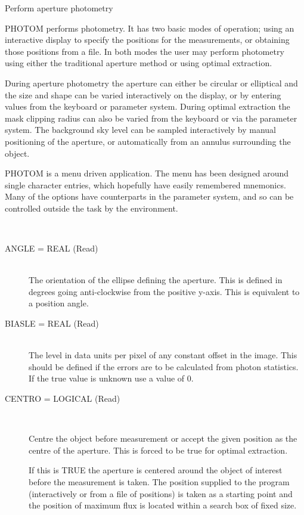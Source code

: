 \documentclass[twoside,11pt]{article}
\renewcommand{\_}{\texttt{\symbol{95}}}
\newcommand{\sstdescription}[1]{\item[Description:] #1}
\newcommand{\sstparameters}[1]{
   \item[Parameters:] \mbox{} \\
   \vspace{-3.5ex}
   \begin{description}
      #1
   \end{description}
}
\newcommand{\sstsubsection}[1]{ \item[{#1}] \mbox{} \\}
\newcommand{\sstdescription}[1]{\item[Description:]
      \begin{description}
         #1
      \end{description}
      \\
   }
\newcommand{\sstparameters}[1]{
      \item[Parameters:] \\
      \begin{description}
         #1
      \end{description}
      \\
   }
\newcommand{\sstsubsection}[1]{\item[{#1}]}
\begin{document}
{
   Perform aperture photometry
}{
   \sstdescription{
      PHOTOM performs photometry. It has two basic modes of operation;
      using an interactive display to specify the positions for the
      measurements, or obtaining those positions from a file. In both
      modes the user may perform photometry using either the traditional
      aperture method or using optimal extraction.

      During aperture photometry the aperture can either be circular
      or elliptical and the size and shape can be varied interactively
      on the display, or by entering values from the keyboard or parameter
      system. During optimal extraction the mask clipping radius can also
      be varied from the keyboard or via the parameter system. The
      background sky level can be sampled interactively by manual
      positioning of the aperture, or automatically from an annulus
      surrounding the object.

      PHOTOM is a menu driven application. The menu has been designed
      around single character entries, which hopefully have easily
      remembered mnemonics. Many of the options have counterparts in the
      parameter system, and so can be controlled outside the task by the
      environment.
   }
   \sstparameters{
      \sstsubsection{
         ANGLE = \_REAL (Read)
      }{
         The orientation of the ellipse defining the aperture. This is
         defined in degrees going anti-clockwise from the positive
         y-axis. This is equivalent to a position angle.
      }
      \sstsubsection{
         BIASLE = \_REAL (Read)
      }{
         The level in data units per pixel of any constant offset in
         the image. This should be defined if the errors are to be
         calculated from photon statistics. If the true value is unknown
         use a value of 0.
      }
      \sstsubsection{
         CENTRO = \_LOGICAL (Read)
      }{
         Centre the object before measurement or accept the given
         position as the centre of the aperture. This is forced to
         be true for optimal extraction.

         If this is TRUE the aperture is centered around the object of
         interest before the measurement is taken. The position supplied
         to the program (interactively or from a file of positions) is
         taken as a starting point and the position of maximum flux is
         located within a search box of fixed size.

}}}
\end{document}

